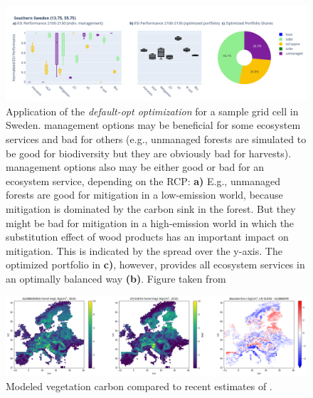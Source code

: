 \documentclass[]{article}
\begin{document}
\begin{figure}[h!]
	\centering
	\includegraphics[width=0.9\linewidth]{supplement_figs/balanced_gridcell.png}
	\caption{Application of the \textit{default-opt optimization} for a sample grid cell in Sweden. management options may be beneficial for some ecosystem services and bad for others (e.g., unmanaged forests are simulated to be good for biodiversity but they are obviously bad for harvests). management options also may be either good or bad for an ecosystem service, depending on the RCP: \textbf{a)} E.g., unmanaged forests are good for mitigation in a low-emission world, because mitigation is dominated by the carbon sink in the forest. But they might be bad for mitigation in a high-emission world in which the substitution effect of wood products has an important impact on mitigation. This is indicated by the spread over the y-axis. The optimized portfolio in \textbf{c)}, however, provides all ecosystem services in an optimally balanced way \textbf{(b)}. Figure taken from \textcite{Gregor2022}}
	\label{fig:balanced-gridcell}
\end{figure}





\begin{figure}[!h]
	\centering
	\includegraphics[width=0.9\linewidth]{supplement_figs/vegC_vs_globbiom.png}
	\caption{Modeled vegetation carbon compared to recent estimates of \textcite{Santoro2021}.}
	\label{fig:vegc}
\end{figure}
\end{document}
